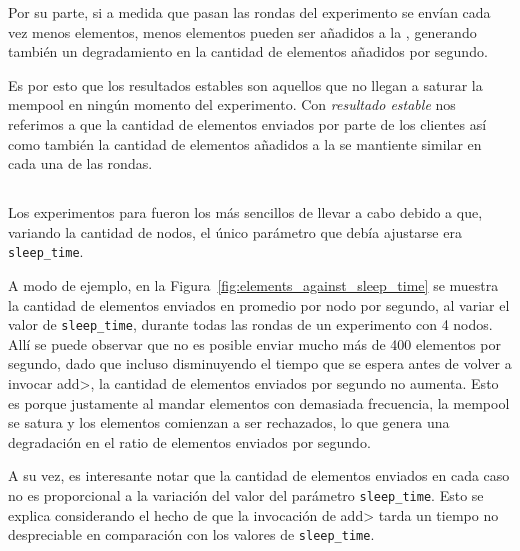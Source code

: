 Por su parte, si a medida que pasan las rondas del experimento se envían cada vez menos elementos, menos elementos pueden ser
añadidos a la \setchain, generando también un degradamiento en la cantidad de elementos añadidos por segundo.

Es por esto que los resultados estables son aquellos que no llegan a saturar la mempool en ningún momento del
experimento. Con \textit{resultado estable} nos referimos a que la cantidad de elementos enviados por parte de
los clientes así como también la cantidad de elementos añadidos a la \setchain se mantiente similar en cada
una de las rondas. 

\subsection{\vanilla}
Los experimentos para \vanilla fueron los más sencillos de llevar a cabo debido a que, variando la cantidad de nodos,
el único parámetro que debía ajustarse era \texttt{sleep\_time}.

A modo de ejemplo, en la Figura~\ref{fig:elements_against_sleep_time} se muestra la cantidad de elementos enviados en promedio por nodo por segundo,
al variar el valor de \texttt{sleep\_time}, durante todas las rondas de un experimento con 4 nodos.
Allí se puede observar que no es posible enviar mucho más de 400 elementos por segundo, dado que incluso disminuyendo el tiempo
que se espera antes de volver a invocar \<add>, la cantidad de elementos enviados por segundo no aumenta.
Esto es porque justamente al mandar elementos con demasiada frecuencia, la mempool se satura y los elementos comienzan a ser
rechazados, lo que genera una degradación en el ratio de elementos enviados por segundo.

A su vez, es interesante notar que la cantidad de elementos enviados en cada caso no es proporcional a la variación del valor del
parámetro \texttt{sleep\_time}.
Esto se explica considerando el hecho de que la invocación de \<add> tarda un tiempo no despreciable en comparación con
los valores de \texttt{sleep\_time}.

